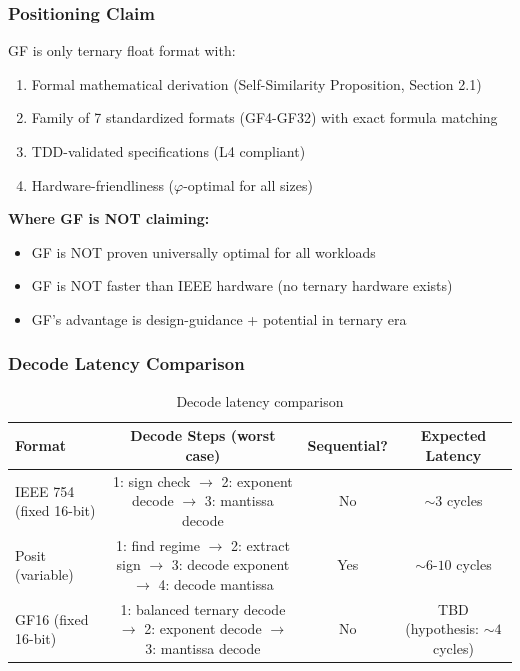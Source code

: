 \documentclass{article}
\begin{document}
\subsubsection{Positioning Claim}

GF is only ternary float format with:
\begin{enumerate}
    \item Formal mathematical derivation (Self-Similarity Proposition, Section 2.1)
    \item Family of 7 standardized formats (GF4-GF32) with exact formula matching
    \item TDD-validated specifications (L4 compliant)
    \item Hardware-friendliness ($\varphi$-optimal for all sizes)
\end{enumerate}

\textbf{Where GF is NOT claiming:}
\begin{itemize}
    \item GF is NOT proven universally optimal for all workloads
    \item GF is NOT faster than IEEE hardware (no ternary hardware exists)
    \item GF's advantage is design-guidance + potential in ternary era
\end{itemize}

\subsubsection{Decode Latency Comparison}

\begin{table}[h]
\centering
\begin{tabular}{lccc}
\toprule
Format & Decode Steps (worst case) & Sequential? & Expected Latency \\
\midrule
IEEE 754 (fixed 16-bit) & 1: sign check $\to$ 2: exponent decode $\to$ 3: mantissa decode & No & $\sim 3$ cycles \\
Posit (variable) & 1: find regime $\to$ 2: extract sign $\to$ 3: decode exponent $\to$ 4: decode mantissa & Yes & $\sim 6$-$10$ cycles \\
GF16 (fixed 16-bit) & 1: balanced ternary decode $\to$ 2: exponent decode $\to$ 3: mantissa decode & No & TBD (hypothesis: $\sim 4$ cycles) \\
\bottomrule
\end{tabular}
\caption{Decode latency comparison}
\end{table}
\end{document}
